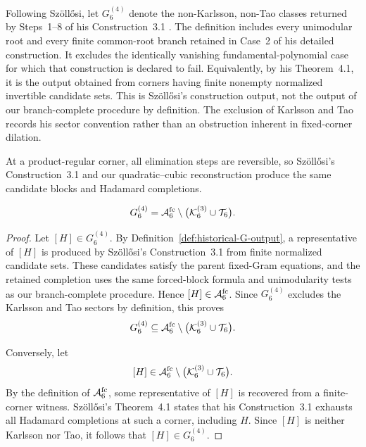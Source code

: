 \begin{definition}
\label{def:historical-G-output}
Following Sz\"oll\H{o}si, let $G_6^{(4)}$ denote the non-Karlsson, non-Tao classes returned by Steps~1--8 of his Construction~3.1 \cite{Szollosi2012FourParameter}. The definition includes every unimodular root and every finite common-root branch retained in Case~2 of his detailed construction. It excludes the identically vanishing fundamental-polynomial case for which that construction is declared to fail. Equivalently, by his Theorem~4.1, it is the output obtained from corners having finite nonempty
normalized invertible candidate sets. This is Sz\"oll\H{o}si's construction
output, not the output of our branch-complete procedure by definition. The
exclusion of Karlsson and Tao records his sector convention rather than an
obstruction inherent in fixed-corner dilation.
\end{definition}

At a product-regular corner, all elimination steps are reversible, so
Sz\"oll\H{o}si's Construction~3.1 and our quadratic--cubic
reconstruction produce the same candidate blocks and Hadamard
completions.


\begin{proposition}
\label{prop:historical-output-identification}
\begin{equation}
G_6^{(4)}
=
\mathcal A_6^{\mathrm{fc}}\setminus
\bigl(\mathcal K_6^{(3)}\cup\mathcal T_6\bigr).
\label{eq:historical-output-identification}
\end{equation}
\end{proposition}

\begin{proof}
Let $[H]\in G_6^{(4)}$. By
Definition~\ref{def:historical-G-output}, a representative of
$[H]$ is produced by Sz\"oll\H{o}si's Construction~3.1 from finite
normalized candidate sets. These candidates satisfy the parent
fixed-Gram equations, and the retained completion uses the same
forced-block formula and unimodularity tests as our branch-complete
procedure. Hence $[H]\in\mathcal A_6^{\mathrm{fc}}$. Since
$G_6^{(4)}$ excludes the Karlsson and Tao sectors by definition,
this proves
\[
G_6^{(4)}
\subseteq
\mathcal A_6^{\mathrm{fc}}\setminus
\bigl(\mathcal K_6^{(3)}\cup\mathcal T_6\bigr).
\]

Conversely, let
\[
[H]\in
\mathcal A_6^{\mathrm{fc}}\setminus
\bigl(\mathcal K_6^{(3)}\cup\mathcal T_6\bigr).
\]
By the definition of $\mathcal A_6^{\mathrm{fc}}$, some representative
of $[H]$ is recovered from a finite-corner witness.
Sz\"oll\H{o}si's Theorem~4.1 states that his Construction~3.1
exhausts all Hadamard completions at such a corner, including $H$.
Since $[H]$ is neither Karlsson nor Tao, it follows that
$[H]\in G_6^{(4)}$.
\end{proof}

